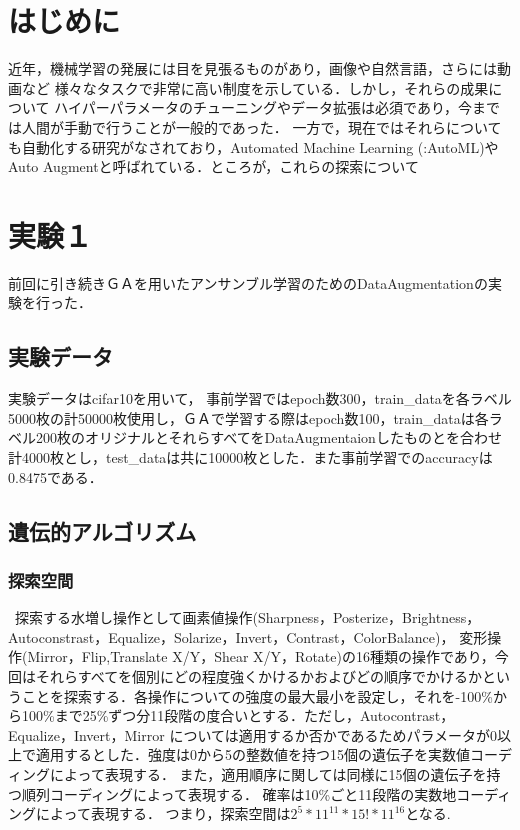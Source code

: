 \documentclass[twocolumn]{jarticle}     %
\begin{document}

\section{はじめに}
 近年，機械学習の発展には目を見張るものがあり，画像や自然言語，さらには動画など
 様々なタスクで非常に高い制度を示している．しかし，それらの成果について
 ハイパーパラメータのチューニングやデータ拡張は必須であり，今までは人間が手動で行うことが一般的であった．
 一方で，現在ではそれらについても自動化する研究がなされており，Automated Machine Learning (:AutoML)や
 Auto Augmentと呼ばれている．ところが，これらの探索について
 

\section{実験１}
前回に引き続きＧＡを用いたアンサンブル学習のためのDataAugmentationの実験を行った．\\

\subsection{実験データ}
実験データはcifar10を用いて，
事前学習ではepoch数300，train\_dataを各ラベル5000枚の計50000枚使用し，ＧＡで学習する際はepoch数100，train\_dataは各ラベル200枚のオリジナルとそれらすべてをDataAugmentaionしたものとを合わせ計4000枚とし，test\_dataは共に10000枚とした．また事前学習でのaccuracyは0.8475である．
\subsection{遺伝的アルゴリズム}


\subsubsection{探索空間}
\ 探索する水増し操作として画素値操作(Sharpness，Posterize，Brightness，Autoconstrast，Equalize，Solarize，Invert，Contrast，ColorBalance)，
変形操作(Mirror，Flip,Translate X/Y，Shear X/Y，Rotate)の16種類の操作であり，今回はそれらすべてを個別にどの程度強くかけるかおよびどの順序でかけるかということを探索する．各操作についての強度の最大最小を設定し，それを-100\%から100\%まで25\%ずつ分11段階の度合いとする．ただし，Autocontrast，Equalize，Invert，Mirror については適用するか否かであるためパラメータが0以上で適用するとした．強度は0から5の整数値を持つ15個の遺伝子を実数値コーディングによって表現する．
また，適用順序に関しては同様に15個の遺伝子を持つ順列コーディングによって表現する．
確率は10\%ごと11段階の実数地コーディングによって表現する．
つまり，探索空間は$2^5*11^{11}*15!*11^{16}$となる.
\end{document}
